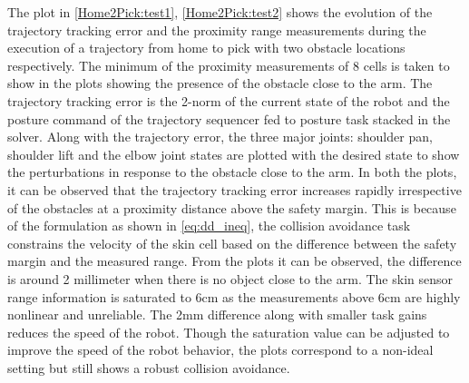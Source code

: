 The plot in \ref{Home2Pick:test1}, \ref{Home2Pick:test2} shows the evolution of the trajectory tracking error and the proximity range measurements during the execution of a trajectory from home to pick with two obstacle locations respectively. The minimum of the proximity measurements of 8 cells is taken to show in the plots showing the presence of the obstacle close to the arm. The trajectory tracking error is the 2-norm of the current state of the robot and the posture command of the trajectory sequencer fed to posture task stacked in the solver.  Along with the trajectory error, the three major joints: shoulder pan, shoulder lift and the elbow joint states are plotted with the desired state to show the perturbations in response to the obstacle close to the arm. In both the plots, it can be observed that the trajectory tracking error increases rapidly irrespective of the obstacles at a proximity distance above the safety margin. This is because of the formulation as shown in \ref{eq:dd_ineq}, the collision avoidance task constrains the velocity of the skin cell based on the difference between the safety margin and the measured range. From the plots it can be observed, the difference is around 2 millimeter when there is no object close to the arm. The skin sensor range information is saturated to 6cm as the measurements above 6cm are highly nonlinear and unreliable. The 2mm difference along with smaller task gains reduces the speed of the robot. Though the saturation value can be adjusted to improve the speed of the robot behavior, the plots correspond to a non-ideal setting but still shows a robust collision avoidance. 


